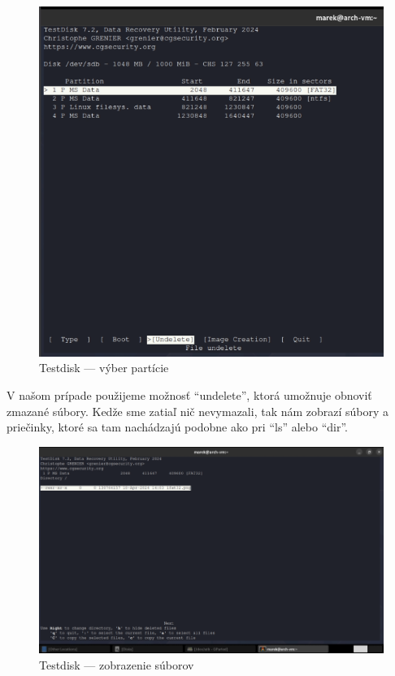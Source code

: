 \documentclass[12pt,oneside,slovak,a4paper]{article}
\begin{document}
\begin{figure}[H]
	\centering
	\includegraphics[scale=0.8]{./images/testdisk_testing/testdisk_choose_partition.png}
	\centering
	\captionsetup{justification=centering,margin=2cm}
	\caption{Testdisk --- výber partície}
\end{figure}

V našom prípade použijeme možnosť ``undelete'', ktorá umožnuje obnoviť zmazané súbory. Kedže sme zatiaľ nič nevymazali, tak nám zobrazí súbory a priečinky, ktoré sa tam nachádzajú podobne ako pri ``ls'' alebo ``dir''.

\begin{figure}[H]
	\centering
	\includegraphics[scale=0.7]{./images/testdisk_testing/testdisk_list_files.png}
	\centering
	\captionsetup{justification=centering,margin=2cm}
	\caption{Testdisk --- zobrazenie súborov}
\end{figure}
\end{document}
